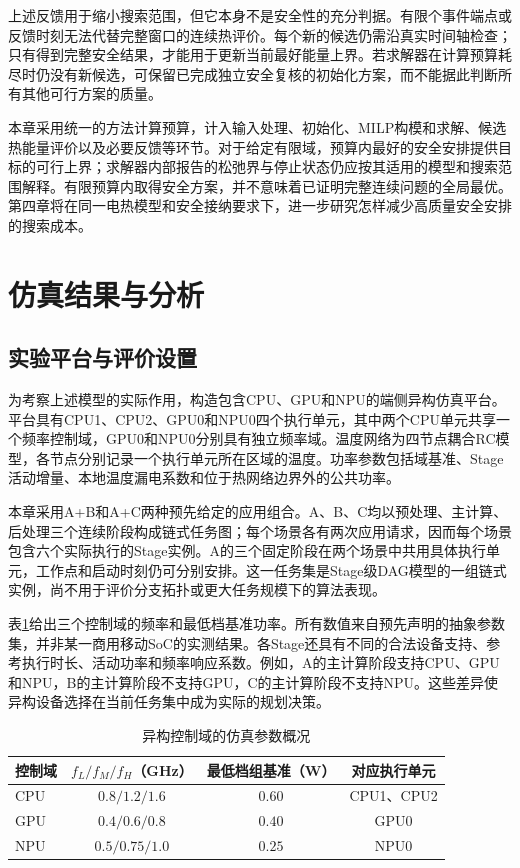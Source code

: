 上述反馈用于缩小搜索范围，但它本身不是安全性的充分判据。有限个事件端点或反馈时刻无法代替完整窗口的连续热评价。每个新的候选仍需沿真实时间轴检查；只有得到完整安全结果，才能用于更新当前最好能量上界。若求解器在计算预算耗尽时仍没有新候选，可保留已完成独立安全复核的初始化方案，而不能据此判断所有其他可行方案的质量。

本章采用统一的方法计算预算，计入输入处理、初始化、MILP构模和求解、候选热能量评价以及必要反馈等环节。对于给定有限域，预算内最好的安全安排提供目标的可行上界；求解器内部报告的松弛界与停止状态仍应按其适用的模型和搜索范围解释。有限预算内取得安全方案，并不意味着已证明完整连续问题的全局最优。第四章将在同一电热模型和安全接纳要求下，进一步研究怎样减少高质量安全安排的搜索成本。


\section{仿真结果与分析}

\subsection{实验平台与评价设置}

为考察上述模型的实际作用，构造包含CPU、GPU和NPU的端侧异构仿真平台。平台具有CPU1、CPU2、GPU0和NPU0四个执行单元，其中两个CPU单元共享一个频率控制域，GPU0和NPU0分别具有独立频率域。温度网络为四节点耦合RC模型，各节点分别记录一个执行单元所在区域的温度。功率参数包括域基准、Stage活动增量、本地温度漏电系数和位于热网络边界外的公共功率。

本章采用A+B和A+C两种预先给定的应用组合。A、B、C均以预处理、主计算、后处理三个连续阶段构成链式任务图；每个场景各有两次应用请求，因而每个场景包含六个实际执行的Stage实例。A的三个固定阶段在两个场景中共用具体执行单元，工作点和启动时刻仍可分别安排。这一任务集是Stage级DAG模型的一组链式实例，尚不用于评价分支拓扑或更大任务规模下的算法表现。

表\ref{tab:c3-platform}给出三个控制域的频率和最低档基准功率。所有数值来自预先声明的抽象参数集，并非某一商用移动SoC的实测结果。各Stage还具有不同的合法设备支持、参考执行时长、活动功率和频率响应系数。例如，A的主计算阶段支持CPU、GPU和NPU，B的主计算阶段不支持GPU，C的主计算阶段不支持NPU。这些差异使异构设备选择在当前任务集中成为实际的规划决策。

\begin{table}[htbp]
 \centering
 \caption{异构控制域的仿真参数概况}
 \label{tab:c3-platform}
 \begin{tabular}{lccc}
 \toprule
 控制域 & $f_L/f_M/f_H$（GHz） & 最低档组基准（W） & 对应执行单元\\
 \midrule
 CPU & $0.8/1.2/1.6$ & $0.60$ & CPU1、CPU2\\
 GPU & $0.4/0.6/0.8$ & $0.40$ & GPU0\\
 NPU & $0.5/0.75/1.0$ & $0.25$ & NPU0\\
 \bottomrule
 \end{tabular}
\end{table}

